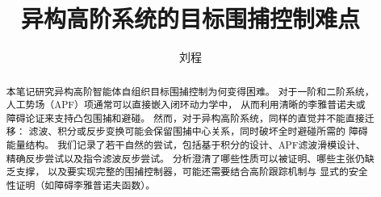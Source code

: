 \documentclass[twocolumn]{IEEEtran}
\title{异构高阶系统的目标围捕控制难点}
\author{刘程}
\begin{document}
\maketitle
    \begin{abstract}
        本笔记研究异构高阶智能体自组织目标围捕控制为何变得困难。
        对于一阶和二阶系统，人工势场（APF）项通常可以直接嵌入闭环动力学中，
        从而利用清晰的李雅普诺夫或障碍论证来支持凸包围捕和避碰。
        然而，对于异构高阶系统，同样的直觉并不能直接迁移：
        滤波、积分或反步变换可能会保留围捕中心关系，同时破坏全时避碰所需的
        障碍能量结构。
        我们记录了若干自然的尝试，包括基于积分的设计、APF滤波滑模设计、
        精确反步尝试以及指令滤波反步尝试。
        分析澄清了哪些性质可以被证明、哪些主张仍缺乏支撑，
        以及要实现完整的围捕控制器，可能还需要结合高阶跟踪机制与
        显式的安全性证明（如障碍李雅普诺夫函数）。
    \end{abstract}

    
    

    
    

    
    

    

    

    
	
\end{document}
